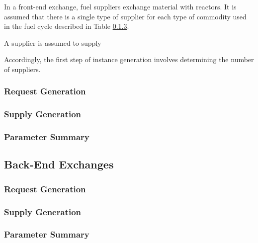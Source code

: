 In a front-end exchange, fuel suppliers exchange material with reactors. It is
assumed that there is a single type of supplier for each type of commodity used
in the fuel cycle described in Table \ref{}.

A supplier is assumed to supply 

Accordingly, the first step of instance generation involves
determining the number of suppliers. 

\subsubsection{Request Generation}

\subsubsection{Supply Generation}

\subsubsection{Parameter Summary}

\subsection{Back-End Exchanges}\label{method:setup:back}

\subsubsection{Request Generation}

\subsubsection{Supply Generation}

\subsubsection{Parameter Summary}
